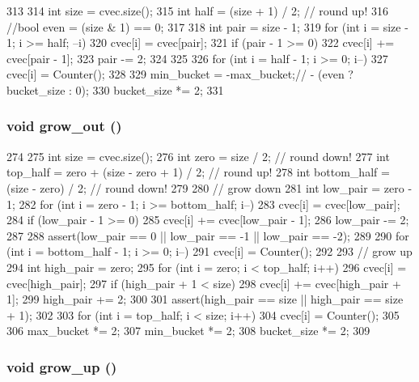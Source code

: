 \begin{DoxyCode}
313 {
314     int size = cvec.size();
315     int half = (size + 1) / 2; // round up!
316     //bool even = (size & 1) == 0;
317 
318     int pair = size - 1;
319     for (int i = size - 1; i >= half; --i) {
320         cvec[i] = cvec[pair];
321         if (pair - 1 >= 0)
322             cvec[i] += cvec[pair - 1];
323         pair -= 2;
324     }
325 
326     for (int i = half - 1; i >= 0; i--)
327         cvec[i] = Counter();
328 
329     min_bucket = -max_bucket;// - (even ? bucket_size : 0);
330     bucket_size *= 2;
331 }
\end{DoxyCode}
\hypertarget{classStats_1_1HistStor_a415f71fcc1cbf430adbf3fdd2e1a5c63}{
\subsubsection[{grow\_\-out}]{\setlength{\rightskip}{0pt plus 5cm}void grow\_\-out ()}}
\label{classStats_1_1HistStor_a415f71fcc1cbf430adbf3fdd2e1a5c63}



\begin{DoxyCode}
274 {
275     int size = cvec.size();
276     int zero = size / 2; // round down!
277     int top_half = zero + (size - zero + 1) / 2; // round up!
278     int bottom_half = (size - zero) / 2; // round down!
279 
280     // grow down
281     int low_pair = zero - 1;
282     for (int i = zero - 1; i >= bottom_half; i--) {
283         cvec[i] = cvec[low_pair];
284         if (low_pair - 1 >= 0)
285             cvec[i] += cvec[low_pair - 1];
286         low_pair -= 2;
287     }
288     assert(low_pair == 0 || low_pair == -1 || low_pair == -2);
289 
290     for (int i = bottom_half - 1; i >= 0; i--)
291         cvec[i] = Counter();
292 
293     // grow up
294     int high_pair = zero;
295     for (int i = zero; i < top_half; i++) {
296         cvec[i] = cvec[high_pair];
297         if (high_pair + 1 < size)
298             cvec[i] += cvec[high_pair + 1];
299         high_pair += 2;
300     }
301     assert(high_pair == size || high_pair == size + 1);
302 
303     for (int i = top_half; i < size; i++)
304         cvec[i] = Counter();
305 
306     max_bucket *= 2;
307     min_bucket *= 2;
308     bucket_size *= 2;
309 }
\end{DoxyCode}
\hypertarget{classStats_1_1HistStor_abe46726abe537958f9a7330be5e6f84c}{
\subsubsection[{grow\_\-up}]{\setlength{\rightskip}{0pt plus 5cm}void grow\_\-up ()}}
\label{classStats_1_1HistStor_abe46726abe537958f9a7330be5e6f84c}



